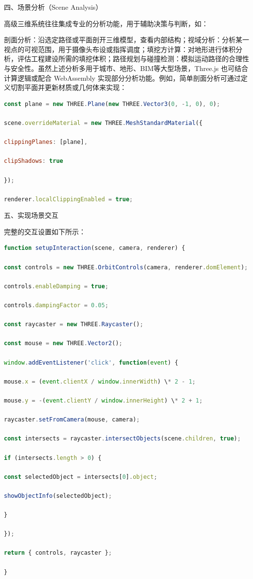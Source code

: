 四、场景分析（Scene Analysis）

高级三维系统往往集成专业的分析功能，用于辅助决策与判断，如：

剖面分析：沿选定路径或平面剖开三维模型，查看内部结构；视域分析：分析某一视点的可视范围，用于摄像头布设或指挥调度；填挖方计算：对地形进行体积分析，评估工程建设所需的填挖体积；路径规划与碰撞检测：模拟运动路径的合理性与安全性。虽然上述分析多用于城市、地形、BIM等大型场景，Three.js 也可结合计算逻辑或配合 WebAssembly 实现部分分析功能。例如，简单剖面分析可通过定义切割平面并更新材质或几何体来实现：

\begin{lstlisting}[language=Javascript]
const plane = new THREE.Plane(new THREE.Vector3(0, -1, 0), 0);

scene.overrideMaterial = new THREE.MeshStandardMaterial({

clippingPlanes: [plane],

clipShadows: true

});

renderer.localClippingEnabled = true;
\end{lstlisting}

五、实现场景交互

完整的交互设置如下所示：

\begin{lstlisting}[language=Javascript]
function setupInteraction(scene, camera, renderer) {

const controls = new THREE.OrbitControls(camera, renderer.domElement);

controls.enableDamping = true;

controls.dampingFactor = 0.05;

const raycaster = new THREE.Raycaster();

const mouse = new THREE.Vector2();

window.addEventListener('click', function(event) {

mouse.x = (event.clientX / window.innerWidth) \* 2 - 1;

mouse.y = -(event.clientY / window.innerHeight) \* 2 + 1;

raycaster.setFromCamera(mouse, camera);

const intersects = raycaster.intersectObjects(scene.children, true);

if (intersects.length > 0) {

const selectedObject = intersects[0].object;

showObjectInfo(selectedObject);

}

});

return { controls, raycaster };

}
\end{lstlisting}

